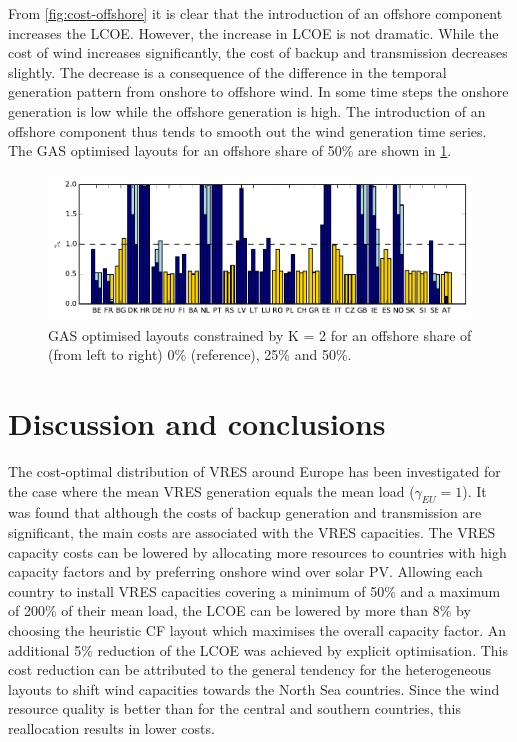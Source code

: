 \documentclass[a4paper, 5p, sort&compress]{elsarticle}%
\begin{document}
From \cref{fig:cost-offshore} it is clear that the introduction of an
offshore component increases the LCOE. However, the increase in LCOE
is not dramatic. While the cost of wind increases
significantly, the cost of backup and transmission decreases
slightly. The decrease is a consequence of the difference in the
temporal generation pattern from onshore to offshore wind. In some
time steps the onshore generation is low while the offshore generation
is high. The introduction of an offshore component thus tends to
smooth out the wind generation time series. %
The GAS optimised layouts for an offshore share of 50\% are shown in
\cref{fig:layout-offshore}.

\begin{figure}[t!]
  \centering
  \includegraphics[width = 2\columnwidth, center]{offshoreLayouts-new}
  \caption{GAS optimised layouts constrained by K = 2 for an offshore
    share of (from left to right) 0\% (reference), 25\% and 50\%.} %
  \label{fig:layout-offshore}
\end{figure}

\section{Discussion and conclusions}
\label{sec:four}

The cost-optimal distribution of VRES around Europe has been
investigated for the case where the mean VRES generation equals the
mean load ($\gamma_{EU} = 1$). It was found that although the costs of
backup generation and transmission are significant, the main costs are
associated with the VRES capacities. The VRES capacity costs can be
lowered by allocating more resources to countries with high capacity
factors and by preferring onshore wind over solar PV. Allowing each
country to install VRES capacities covering a minimum of 50\% and a
maximum of 200\% of their mean load, the LCOE can be lowered by more
than 8\% by choosing the heuristic CF layout which maximises the
overall capacity factor. An additional 5\% reduction of the LCOE was
achieved by explicit optimisation. This cost reduction can be
attributed to the general tendency for the heterogeneous layouts to
shift wind capacities towards the North Sea countries. Since the wind
resource quality is better than for the central and southern
countries, this reallocation results in lower costs.
\end{document}
